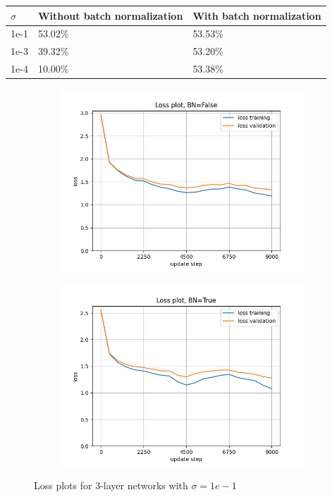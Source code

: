 \documentclass[12pt, a4paper]{article}
\begin{document}
\begin{table}[H]
    \begin{tabular}{l|ll}
        $\sigma$ & Without batch normalization & With batch normalization \\ \hline
        1e-1     & 53.02\%                     & 53.53\%                  \\
        1e-3     & 39.32\%                     & 53.20\%                  \\
        1e-4     & 10.00\%                     & 53.38\%
    \end{tabular}
\end{table}
\begin{figure}[H]
    \centering
    \begin{subfigure}{0.45\textwidth}
        \centering
        \includegraphics[width=\textwidth]{results/2-2250-3-loss-False-0.1.png}
    \end{subfigure}
    \hfill
    \begin{subfigure}{0.45\textwidth}
        \centering
        \includegraphics[width=\textwidth]{results/2-2250-3-loss-True-0.1.png}
    \end{subfigure}
    \caption{Loss plots for 3-layer networks with $\sigma=1e-1$}
\end{figure}
\end{document}

